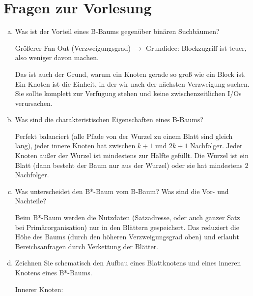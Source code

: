 \section{Fragen zur Vorlesung}
\begin{enumerate}[a)]
	\item Was ist der Vorteil eines B-Baums gegenüber binären Suchbäumen?

	\begin{solution}
	Größerer Fan-Out (Verzweigungsgrad) $\rightarrow$ Grundidee: Blockzugriff ist teuer, also weniger davon machen.

	Das ist auch der Grund, warum ein Knoten gerade so groß wie ein Block ist. Ein Knoten ist die Einheit, in der wir nach der nächsten Verzweigung suchen. Sie sollte komplett zur Verfügung stehen und keine zwischenzeitlichen I/Os verursachen.
	\end{solution}


	\item Was sind die charakteristischen Eigenschaften eines B-Baums?

	\begin{solution}
	Perfekt balanciert (alle Pfade von der Wurzel zu einem Blatt sind gleich lang), jeder innere Knoten hat zwischen $k+1$ und $2k+1$ Nachfolger. Jeder Knoten außer der Wurzel ist mindestens zur Hälfte gefüllt. Die Wurzel ist ein Blatt (dann besteht der Baum nur aus der Wurzel) oder sie hat mindestens 2 Nachfolger.
	\end{solution}


	\item Was unterscheidet den B*-Baum vom B-Baum? Was sind die Vor- und Nachteile?

	\begin{solution}
	Beim B*-Baum werden die Nutzdaten (Satzadresse, oder auch ganzer Satz bei Primärorganisation) nur in den Blättern gespeichert. Das reduziert die Höhe des Baums (durch den höheren Verzweigungsgrad oben) und erlaubt Bereichsanfragen durch Verkettung der Blätter.
	\end{solution}

	\item Zeichnen Sie schematisch den Aufbau eines Blattknotens und eines inneren Knotens eines B*-Baums.

	\begin{solution}

	Innerer Knoten:

		\begin{center}
		\begin{tikzpicture}


\end{tikzpicture}
\end{center}
\end{solution}
\end{enumerate}

